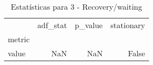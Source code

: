\begin{table}[htbp]
\caption{Estatísticas para 3 - Recovery/waiting}
\label{tab:3_-_recovery_waiting_adf_test}
\begin{tabular}{lrrr}
\toprule
 & adf_stat & p_value & stationary \\
metric &  &  &  \\
\midrule
value & NaN & NaN & False \\
\bottomrule
\end{tabular}
\end{table}
